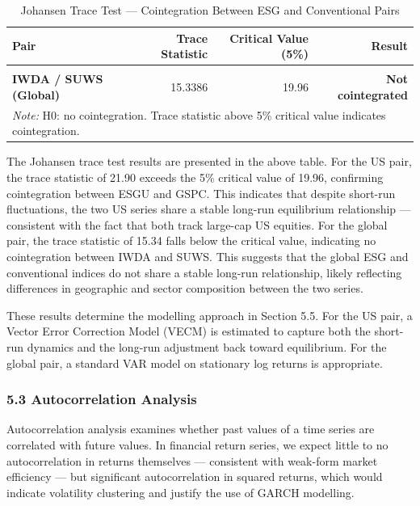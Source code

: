 \documentclass[
]{article}
\begin{document}
\begin{longtable}[t]{>{}lrr>{}r}
\caption{\label{tab:cointegration-test}Johansen Trace Test — Cointegration Between ESG and Conventional Pairs}\\
\toprule
Pair & Trace Statistic & Critical Value (5\%) & Result\\
\midrule
\textbf{\cellcolor{gray!10}{ESGU / GSPC (US)}} & \cellcolor{gray!10}{21.8961} & \cellcolor{gray!10}{19.96} & \textbf{\cellcolor{gray!10}{Cointegrated}}\\
\textbf{IWDA / SUWS (Global)} & 15.3386 & 19.96 & \textbf{Not cointegrated}\\
\bottomrule
\multicolumn{4}{l}{\rule{0pt}{1em}\textit{Note: } H0: no cointegration. Trace statistic above 5\% critical value indicates cointegration.}\\
\end{longtable}
\endgroup{}

The Johansen trace test results are presented in the above table. For
the US pair, the trace statistic of 21.90 exceeds the 5\% critical value
of 19.96, confirming cointegration between ESGU and GSPC. This indicates
that despite short-run fluctuations, the two US series share a stable
long-run equilibrium relationship --- consistent with the fact that both
track large-cap US equities. For the global pair, the trace statistic of
15.34 falls below the critical value, indicating no cointegration
between IWDA and SUWS. This suggests that the global ESG and
conventional indices do not share a stable long-run relationship, likely
reflecting differences in geographic and sector composition between the
two series.

These results determine the modelling approach in Section 5.5. For the
US pair, a Vector Error Correction Model (VECM) is estimated to capture
both the short-run dynamics and the long-run adjustment back toward
equilibrium. For the global pair, a standard VAR model on stationary log
returns is appropriate.

\subsubsection{5.3 Autocorrelation
Analysis}\label{autocorrelation-analysis}

Autocorrelation analysis examines whether past values of a time series
are correlated with future values. In financial return series, we expect
little to no autocorrelation in returns themselves --- consistent with
weak-form market efficiency --- but significant autocorrelation in
squared returns, which would indicate volatility clustering and justify
the use of GARCH modelling.
\end{document}
